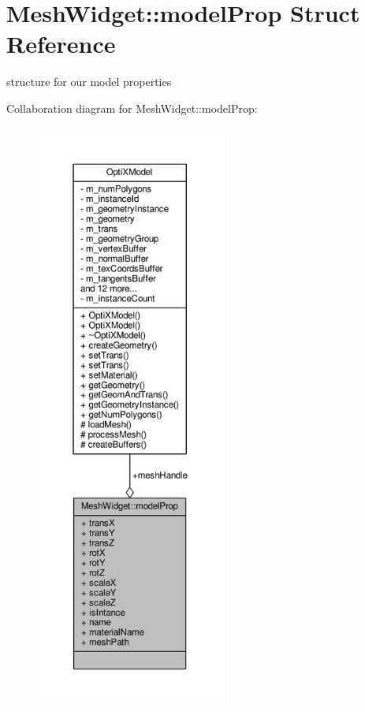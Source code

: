 \hypertarget{struct_mesh_widget_1_1model_prop}{\section{Mesh\-Widget\-:\-:model\-Prop Struct Reference}
\label{struct_mesh_widget_1_1model_prop}
}


structure for our model properties  




Collaboration diagram for Mesh\-Widget\-:\-:model\-Prop\-:
\nopagebreak
\begin{figure}[H]
\begin{center}
\leavevmode
\includegraphics[height=550pt]{struct_mesh_widget_1_1model_prop__coll__graph}
\end{center}
\end{figure}
